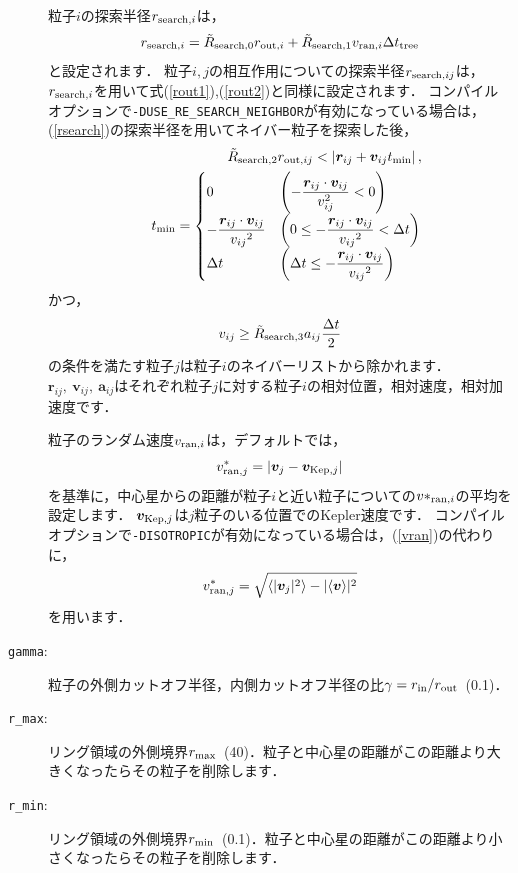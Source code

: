 \documentclass[12pt,a4paper,dvipdfmx]{jsarticle}
\begin{document}
\begin{description}
粒子$i$の探索半径$r_{{\rm search},i}$は，
\begin{equation}
r_{{\rm search},i}=\tilde{R}_{\rm search,0}r_{{\rm out},i}+\tilde{R}_{\rm search,1}v_{{\rm ran},i}\Delta t_{\rm tree}\label{rsearch}
\end{equation}
と設定されます．
粒子$i,j$の相互作用についての探索半径$r_{{\rm search},ij}$は，$r_{{\rm search},i}$を用いて式(\ref{rout1}),(\ref{rout2})と同様に設定されます．
コンパイルオプションで\texttt{-DUSE\_RE\_SEARCH\_NEIGHBOR}が有効になっている場合は，(\ref{rsearch})の探索半径を用いてネイバー粒子を探索した後，
\begin{eqnarray}
&&\tilde{R}_{\rm  search,2}{r_{{\rm out},ij}} < \left| \bm{r}_{ij}+\bm{v}_{ij}t_{\rm min} \right|,\\
&&t_{\rm min}=
\begin{cases}
0 & \left(-\displaystyle\frac{\bm{r}_{ij}\cdot\bm{v}_{ij}}{{v}_{ij}^2}<0\right) \\
-\displaystyle\frac{\bm{r}_{ij}\cdot\bm{v}_{ij}}{{v_{ij}}^2} & 
\left(0\leq -\displaystyle\frac{\bm{r}_{ij}\cdot\bm{v}_{ij}}{{v_{ij}}^2}<\Delta t\right)\\
\Delta t & \left(\Delta t\leq -\displaystyle\frac{\bm{r}_{ij}\cdot\bm{v}_{ij}}{{v_{ij}}^2}\right)
\end{cases}
\end{eqnarray}
かつ，
\begin{eqnarray}
v_{ij} \geq \tilde{R}_{\rm  search,3}a_{ij}\frac{\Delta t}{2}
\end{eqnarray}
の条件を満たす粒子$j$は粒子$i$のネイバーリストから除かれます．
$\bm{r}_{ij},\ \bm{v}_{ij},\ \bm{a}_{ij}$はそれぞれ粒子$j$に対する粒子$i$の相対位置，相対速度，相対加速度です．

粒子のランダム速度$v_{{\rm ran},i}$は，デフォルトでは，
\begin{equation}
v^{*}_{{\rm ran},j}=\left|\bm{v}_{j}-\bm{v}_{{\rm Kep},j}\right|\label{vran}
\end{equation}
を基準に，中心星からの距離が粒子$i$と近い粒子についての$v*_{{\rm ran},i}$の平均を設定します．
$\bm{v}_{{\rm Kep},j}$は$j$粒子のいる位置でのKepler速度です．
コンパイルオプションで\texttt{-DISOTROPIC}が有効になっている場合は，(\ref{vran})の代わりに，
\begin{equation}
v^{*}_{{\rm ran},j}=\sqrt{\langle |\bm{v}_{j}|^{2}\rangle-|\langle \bm{v}\rangle|^{2}}
\end{equation}
を用います．

\item[\texttt{gamma}:]
粒子の外側カットオフ半径，内側カットオフ半径の比$\gamma=r_{\rm in}/r_{\rm out}$\ (0.1)．
\item[\texttt{r\_max}:]
リング領域の外側境界$r_{\rm max}$\ (40)．粒子と中心星の距離がこの距離より大きくなったらその粒子を削除します．
\item[\texttt{r\_min}:]
リング領域の外側境界$r_{\rm min}$\ (0.1)．粒子と中心星の距離がこの距離より小さくなったらその粒子を削除します．
\end{description}
\end{document}
